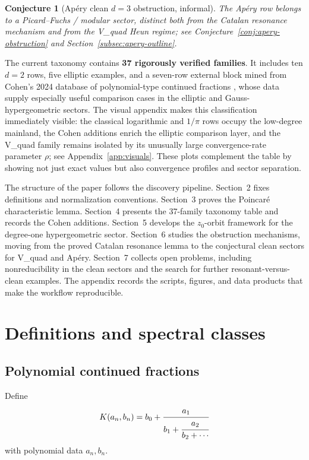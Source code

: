 \documentclass[11pt]{article}
\newtheorem{conjecture}[theorem]{Conjecture}
\begin{document}
\begin{conjecture}[Ap\'ery clean $d=3$ obstruction, informal]
The Ap\'ery row belongs to a Picard--Fuchs / modular sector, distinct both from the Catalan resonance mechanism and from the V\_quad Heun regime; see Conjecture~\ref{conj:apery-obstruction} and Section~\ref{subsec:apery-outline}.
\end{conjecture}

The current taxonomy contains \textbf{37 rigorously verified families}. It includes ten $d=2$ rows, five elliptic examples, and a seven-row external block mined from Cohen's 2024 database of polynomial-type continued fractions \cite{cohen2024database}, whose data supply especially useful comparison cases in the elliptic and Gauss-hypergeometric sectors. The visual appendix makes this classification immediately visible: the classical logarithmic and $1/\pi$ rows occupy the low-degree mainland, the Cohen additions enrich the elliptic comparison layer, and the V\_quad family remains isolated by its unusually large convergence-rate parameter $\rho$; see Appendix~\ref{app:visuals}. These plots complement the table by showing not just exact values but also convergence profiles and sector separation.

The structure of the paper follows the discovery pipeline. Section~2 fixes definitions and normalization conventions. Section~3 proves the Poincar\'e characteristic lemma. Section~4 presents the 37-family taxonomy table and records the Cohen additions. Section~5 develops the $z_0$-orbit framework for the degree-one hypergeometric sector. Section~6 studies the obstruction mechanisms, moving from the proved Catalan resonance lemma to the conjectural clean sectors for V\_quad and Ap\'ery. Section~7 collects open problems, including nonreducibility in the clean sectors and the search for further resonant-versus-clean examples. The appendix records the scripts, figures, and data products that make the workflow reproducible.

\section{Definitions and spectral classes}
\subsection{Polynomial continued fractions}
Define
\[
K(a_n,b_n) = b_0 + \cfrac{a_1}{b_1 + \cfrac{a_2}{b_2 + \cdots}}
\]
with polynomial data $a_n,b_n$.
\end{document}
